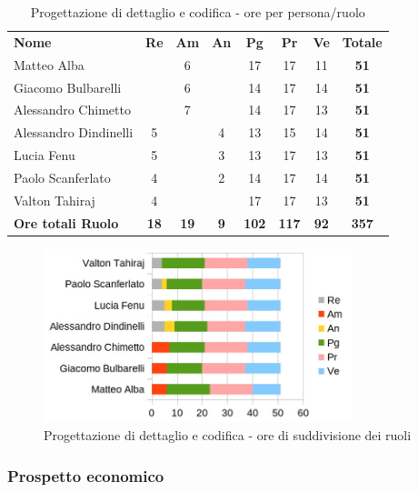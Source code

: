 		\begin{table} [h!]
			\begin{center}
				\begin{tabular} { m{3.5cm} c c c c c c c }
					\rowcolor{lightgray}
					\textbf{Nome} & \textbf{Re} & \textbf{Am} & \textbf{An} & \textbf{Pg} & \textbf{Pr} & \textbf{Ve} & \textbf{Totale} \\
					Matteo Alba & & 6 & & 17 & 17 & 11 & \textbf{51} \\
					Giacomo Bulbarelli & & 6 & & 14 & 17 & 14 & \textbf{51} \\
					Alessandro Chimetto & & 7 & & 14 & 17 & 13 & \textbf{51} \\
					Alessandro Dindinelli & 5 & & 4 & 13 & 15 & 14 & \textbf{51} \\
					Lucia Fenu & 5 & & 3 & 13 & 17 & 13 & \textbf{51} \\
					Paolo Scanferlato & 4 & & 2 & 14 & 17 & 14 & \textbf{51} \\
					Valton Tahiraj & 4 & & & 17 & 17 & 13 & \textbf{51} \\
					\textbf{Ore totali Ruolo} & \textbf{18} & \textbf{19} & \textbf{9} & \textbf{102} & \textbf{117}& \textbf{92} & \textbf{357}
				\end{tabular}
				\caption{Progettazione di dettaglio e codifica - ore per persona/ruolo}
			\end{center}
		\end{table}
	
		\begin{figure} [h!]
			\centering
			\includegraphics[width=0.8\textwidth]{res/img/grafici/progettazione_di_dettaglio_e_codifica_ore_ruolo.jpg}
			\caption{Progettazione di dettaglio e codifica - ore di suddivisione dei ruoli} 
		\end{figure}
	
	\newpage
	
	\subsubsection{Prospetto economico}
	
